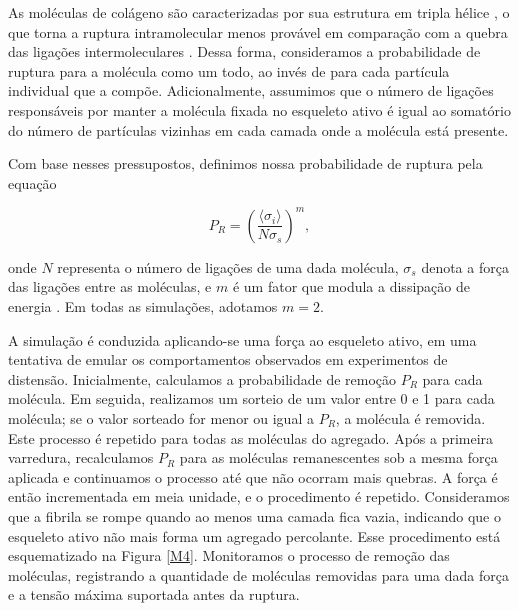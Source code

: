 \documentclass{article}
\begin{document}
        As moléculas de colágeno são caracterizadas por sua estrutura em tripla hélice \cite{BRODSKY1997545}, o que torna a ruptura intramolecular 
        menos provável em comparação com a quebra das ligações intermoleculares \cite{Parkinson1997}. Dessa forma, consideramos a probabilidade 
        de ruptura para a molécula como um todo, ao invés de para cada partícula individual que a compõe. Adicionalmente, assumimos que o número de 
        ligações responsáveis por manter a molécula fixada no esqueleto ativo é igual ao somatório do número de partículas vizinhas em cada camada 
        onde a molécula está presente. 

        Com base nesses pressupostos, definimos nossa probabilidade de ruptura pela equação 

        \begin{equation}
            P_{R} = \left(\frac{\langle \sigma_{i} \rangle}{N \sigma_{s}}\right)^{m},
        \end{equation}

        onde \(N\) representa o número de ligações de uma dada molécula, \(\sigma_{s}\) denota a força das ligações entre as moléculas, e \(m\) é um 
        fator que modula a dissipação de energia \cite{Parkinson1997,2013}. Em todas as simulações, adotamos \(m = 2\). 

        A simulação é conduzida aplicando-se uma força ao esqueleto ativo, em uma tentativa de emular os comportamentos observados em experimentos de 
        distensão. Inicialmente, calculamos a probabilidade de remoção \(P_{R}\) para cada molécula. Em seguida, realizamos um sorteio de um valor 
        entre 0 e 1 para cada molécula; se o valor sorteado for menor ou igual a \(P_{R}\), a molécula é removida. Este processo é repetido para 
        todas as moléculas do agregado. Após a primeira varredura, recalculamos \(P_{R}\) para as moléculas remanescentes sob a mesma força aplicada 
        e continuamos o processo até que não ocorram mais quebras. A força é então incrementada em meia unidade, e o procedimento é repetido. 
        Consideramos que a fibrila se rompe quando ao menos uma camada fica vazia, indicando que o esqueleto ativo não mais forma um agregado 
        percolante. Esse procedimento está esquematizado na Figura \ref{M4}. Monitoramos o processo de remoção das moléculas, registrando a quantidade 
        de moléculas removidas para uma dada força e a tensão máxima suportada antes da ruptura. 
\end{document}
